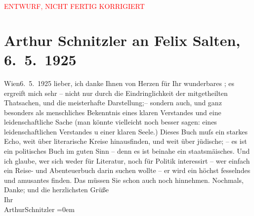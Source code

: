
\begin{center}
            \textcolor{red}{ENTWURF, NICHT FERTIG KORRIGIERT}
                      \end{center}
            
         
         \renewcommand{\erwaehntePersonen}{Personen: Felix Salten}
         \renewcommand{\erwaehnteOrte}{Orte: Palästina, Wien}
         \renewcommand{\erwaehnteWerke}{Werke: Neue Menschen auf alter Erde. Eine Palästinafahrt}
               \section[Arthur Schnitzler an Felix Salten, 6. 5. 1925]{ Arthur Schnitzler an Felix Salten, 6. 5. 1925}\nopagebreak{}\rehead{ }\begin{ledgroupsized}[t]{13cm}\normalsize\beginnumbering \toendnotes[C]{\smallbreak\pagebreak[2]} 
\toendnotes[C]{\smallbreak}\pstart
           \raggedleft{}{\pb}Wien6. 5. 1925\pend
           \pstart
           lieber, ich danke Ihnen von Herzen für Ihr wunderbares \label{K_L03021-1v}\label{K_L03021-1h}; es ergreift
               mich sehr – nicht nur durch die Eindringlichkeit der mitgetheilten Thatsachen, und
               die meisterhafte Darstellung;– sondern auch, und ganz besonders als menschliches
               Bekenntnis eines klaren Verstandes und eine leidenschaftliche Sache (man könnte
               vielleicht noch besser sagen: eines leidenschaftlichen Verstandes u einer klaren
               Seele.) Dieses Buch muſs ein starkes Echo, weit über literarische Kreise
               hinausfinden, und weit über jüdische; – es ist ein politisches Buch im guten Sinn –
               denn es ist beinahe ein staatsmä{\geminationn}isches. Und ich glaube,
               wer sich weder für Literatur, noch {\pb}für Politik interessirt – wer einfach
               ein Reise- und Abenteuerbuch darin \strikeout{\textcolor{gray}{finden}} suchen wollte – er wird ein höchst fesselndes und amusantes  finden. Das müssen Sie schon auch noch hinnehmen. \pend
           \pstart
           Nochmals, Danke; und die herzlichsten Grüße {\\[\baselineskip]}Ihr {\\[\baselineskip]}\spacefill\mbox{ArthurSchnitzler}\pend
           \leftskip=0em{}
         
         \endnumbering{}\end{ledgroupsized}\begin{anhang}\end{anhang}\newcommand{\dateiname}{L03021}\newcommand{\titel}{Arthur Schnitzler an Felix Salten, 6. 5. 1925}\newcommand{\editorInnen}{Martin Anton Müller und Laura Untner}
      
